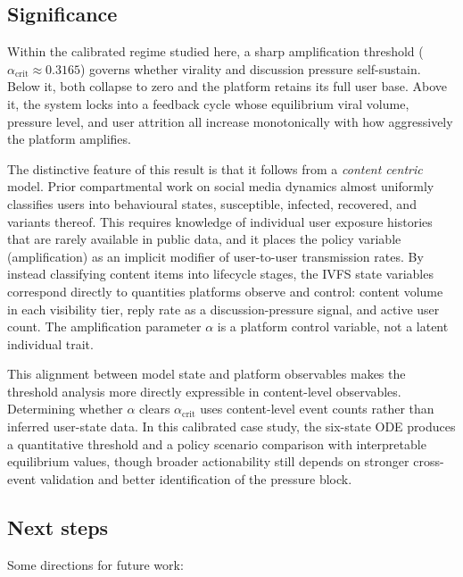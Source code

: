 \documentclass[11pt]{article}
\begin{document}
\subsection{Significance}

Within the calibrated regime studied here, a sharp amplification threshold ($\alpha_{\mathrm{crit}} \approx 0.3165$) governs whether virality and discussion pressure self-sustain. Below it, both collapse to zero and the platform retains its full user base. Above it, the system locks into a feedback cycle whose equilibrium viral volume, pressure level, and user attrition all increase monotonically with how aggressively the platform amplifies.

The distinctive feature of this result is that it follows from a \emph{content centric} model. Prior compartmental work on social media dynamics almost uniformly classifies users into behavioural states, susceptible, infected, recovered, and variants thereof. This requires knowledge of individual user exposure histories that are rarely available in public data, and it places the policy variable (amplification) as an implicit modifier of user-to-user transmission rates. By instead classifying content items into lifecycle stages, the IVFS state variables correspond directly to quantities platforms observe and control: content volume in each visibility tier, reply rate as a discussion-pressure signal, and active user count. The amplification parameter $\alpha$ is a platform control variable, not a latent individual trait.

This alignment between model state and platform observables makes the threshold analysis more directly expressible in content-level observables. Determining whether $\alpha$ clears $\alpha_{\mathrm{crit}}$ uses content-level event counts rather than inferred user-state data. In this calibrated case study, the six-state ODE produces a quantitative threshold and a policy scenario comparison with interpretable equilibrium values, though broader actionability still depends on stronger cross-event validation and better identification of the pressure block.

\subsection{Next steps}
\label{sec:nextsteps}

Some directions for future work:
\end{document}
